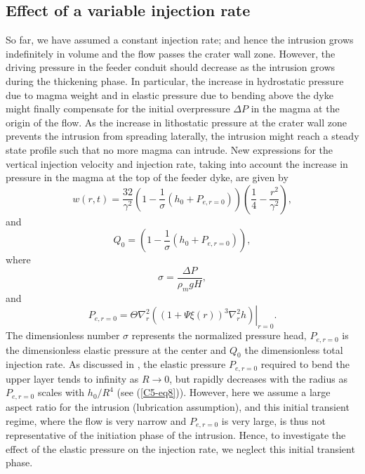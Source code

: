 \subsection{Effect of a variable injection rate}
\label{C5-Injection_Rate}
	 
So  far, we  have assumed  a constant  injection rate;  and hence  the
intrusion grows indefinitely in volume  and the flow passes the crater
wall zone.  However, the driving pressure in the feeder conduit should
decrease  as the  intrusion  grows during  the  thickening phase.   In
particular, the increase  in hydrostatic pressure due  to magma weight
and in  elastic pressure due to  bending above the dyke  might finally
compensate for the initial overpressure $\Delta P$ in the magma at the
origin of  the flow.  As the  increase in lithostatic pressure  at the
crater wall zone prevents the  intrusion from spreading laterally, the
intrusion might reach  a steady state profile such that  no more magma
can intrude. New  expressions for the vertical  injection velocity and
injection rate,  taking into account  the increase in pressure  in the
magma at the top of the feeder dyke, are given by
\begin{equation}
  w(r,t)=\frac{32}{\gamma^{2}} \left(1-\frac{1}{\sigma}\left(h_0+P_{e,r=0} \right)\right)
  \left(\frac{1}{4}-\frac{r^{2}}{\gamma^{2}}\right),
  \label{C5-5.3}
\end{equation}
and
\begin{equation}
  Q_{0}=\left(1-\frac{1}{\sigma}\left(h_0+ P_{e,r=0}\right)\right),
  \label{C5-eq5.4}
\end{equation}
where
\begin{equation}
  \sigma=\frac{\Delta P}{\rho_{m}gH},
  \label{C5-eq5.4.5}
\end{equation}
and
\begin{equation}
  P_{e,r=0}= \Theta \nabla^{2}_{r}\left.\left ((1+\Psi \xi(r))^{3}\nabla^{2}_{r}h \right )\right|_{r=0}.
\end{equation}
The dimensionless  number $\sigma$ represents the  normalized pressure
head, $P_{e,r=0}$ is the dimensionless  elastic pressure at the center
and $Q_{0}$ the  dimensionless total injection rate.   As discussed in
\citet{Michaut:2011kg}, the  elastic pressure $P_{e,r=0}$  required to
bend  the upper  layer  tends  to infinity  as  $R\rightarrow 0$,  but
rapidly decreases with the radius as $P_{e,r=0}$ scales with $h_0/R^4$
(see (\ref{C5-eq8})). However, here we assume a large aspect ratio for
the  intrusion (lubrication  assumption), and  this initial  transient
regime, where the  flow is very narrow and $P_{e,r=0}$  is very large,
is  thus   not  representative   of  the   initiation  phase   of  the
intrusion. Hence, to investigate the effect of the elastic pressure on
the injection rate, we neglect this initial transient phase.

